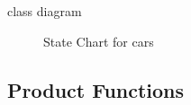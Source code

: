 \documentclass[english]{article}
\begin{document}
class diagram

\begin{figure}[H]
	\centering
	\caption{State Chart for cars}
	\label{statechart}
\end{figure}

\subsection{Product Functions}\label{goals}
\end{document}
